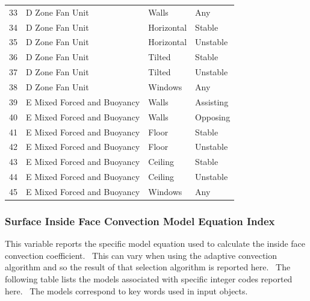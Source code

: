 \begin{longtable}[c]{p{1.5in}p{1.5in}p{1.5in}p{1.5in}}
33 & D Zone Fan Unit & Walls & Any \tabularnewline
34 & D Zone Fan Unit & Horizontal & Stable \tabularnewline
35 & D Zone Fan Unit & Horizontal & Unstable \tabularnewline
36 & D Zone Fan Unit & Tilted & Stable \tabularnewline
37 & D Zone Fan Unit & Tilted & Unstable \tabularnewline
38 & D Zone Fan Unit & Windows & Any \tabularnewline
39 & E Mixed Forced and Buoyancy & Walls & Assisting \tabularnewline
40 & E Mixed Forced and Buoyancy & Walls & Opposing \tabularnewline
41 & E Mixed Forced and Buoyancy & Floor & Stable \tabularnewline
42 & E Mixed Forced and Buoyancy & Floor & Unstable \tabularnewline
43 & E Mixed Forced and Buoyancy & Ceiling & Stable \tabularnewline
44 & E Mixed Forced and Buoyancy & Ceiling & Unstable \tabularnewline
45 & E Mixed Forced and Buoyancy & Windows & Any \tabularnewline
\bottomrule
\end{longtable}

\subsubsection{Surface Inside Face Convection Model Equation Index}\label{surface-inside-face-convection-model-equation-index}

This variable reports the specific model equation used to calculate the inside face convection coefficient.~ This can vary when using the adaptive convection algorithm and so the result of that selection algorithm is reported here.~ The following table lists the models associated with specific integer codes reported here.~ The models correspond to key words used in input objects.


